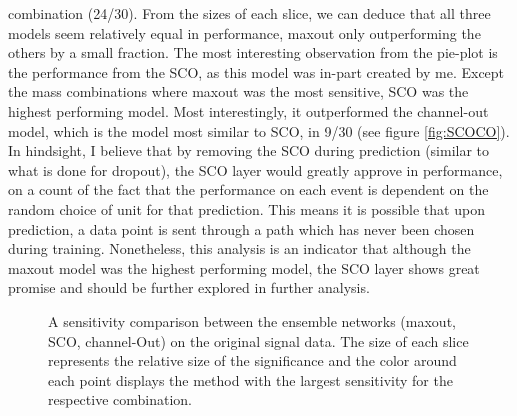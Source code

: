 combination (24/30). From the sizes of each slice, we can deduce that all three models seem relatively equal in performance, maxout only 
outperforming the others by a small fraction. The most interesting observation from the pie-plot is the performance from the \ac{SCO}, as 
this model was in-part created by me. Except the mass combinations where maxout was the most sensitive, \ac{SCO} was the highest performing model. 
Most interestingly, it outperformed the channel-out model, which is the model most similar to \ac{SCO}, in 9/30 (see figure \ref{fig:SCOCO}). 
In hindsight, I believe that by removing the \ac{SCO} during prediction (similar to what is done for dropout), the \ac{SCO} layer would greatly 
approve in performance, on a count of the fact that the performance on each event is dependent on the random choice of unit for that prediction.
This means it is possible that upon prediction, a data point is sent through a path which has never been chosen during training. 
Nonetheless, this analysis is an indicator that although the maxout model was the highest performing model, the \ac{SCO} layer shows 
great promise and should be further explored in further analysis. 
\begin{figure}
    \caption[A sensitivity comparison between the ensemble networks (maxout, \acs{SCO}, channel-Out) on the original 
    signal data.]{A sensitivity comparison between the ensemble networks (maxout, \acs{SCO}, channel-Out) on the original 
    signal data. The size of each slice represents the relative size of the significance and the color around each 
    point displays the method with the largest sensitivity for the respective combination.}
    \label{fig:EnsembleComp}
\end{figure}

